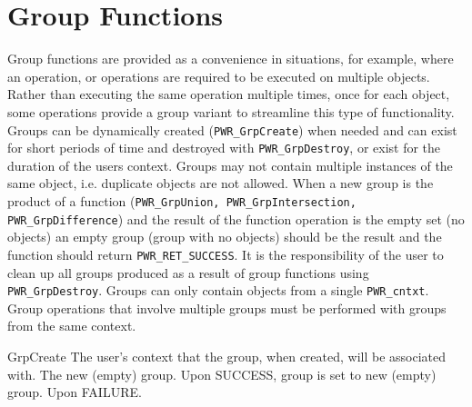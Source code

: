 \section{Group Functions}\label{sec:Group}

Group functions are provided as a convenience in situations, for example, where an operation, or operations are required to be executed on multiple objects. 
Rather than executing the same operation multiple times, once for each object, some operations provide a group variant to streamline this type of functionality.
Groups can be dynamically created (\texttt{PWR_GrpCreate}) when needed and can exist for short periods of time and destroyed with \texttt{PWR_GrpDestroy}, or exist for the duration of the users context.
Groups may not contain multiple instances of the same object, i.e. duplicate objects are not allowed.
When a new group is the product of a function (\texttt{PWR_GrpUnion, PWR_GrpIntersection, PWR_GrpDifference}) and the result of the function operation is the empty set (no objects) an empty group (group with no objects)  should be the result and the function should return \texttt{PWR_RET_SUCCESS}. 
It is the responsibility of the user to clean up all groups produced as a result of group functions using \texttt{PWR_GrpDestroy}.
Groups can only contain objects from a single \texttt{PWR_cntxt}.
Group operations that involve multiple groups must be performed with groups from the same context.

\begin{prototype}{GrpCreate}
		{\pInput} {The user's context that the group, when created, will be associated with.}
	   	{\pOutput}{The new (empty) group.}
	 	{Upon SUCCESS, group is set to new (empty) group.}
	 	{Upon FAILURE.}
\end{prototype}


